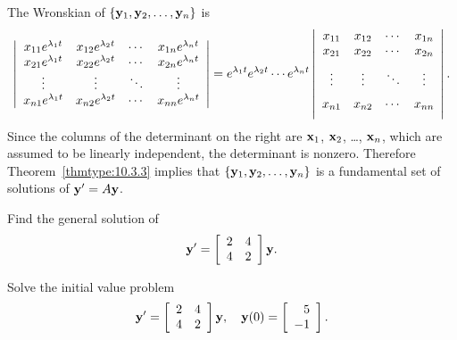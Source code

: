 The Wronskian of $\{{\bf y}_{1},{\bf y}_{2},\ldots,{\bf y}_{n}\}$ is
\[
  \left|
  \begin{array}{cccc}
    x_{11}e^{\lambda_{1}t} & x_{12}e^{\lambda_{2} t} & \cdots & x_{1n}e^{\lambda_{n}t}   \\
    x_{21}e^{\lambda_{1}t} & x_{22}e^{\lambda_{2} t} & \cdots & x_{2n}e^{\lambda_{n}t}   \\
    \vdots                 & \vdots                  & \ddots & \vdots                   \\
    x_{n1}e^{\lambda_{1}t} & x_{n2}e^{\lambda_{2} t} & \cdots & x_{nn}e^{\lambda _{n}t}
  \end{array}\right| =e^{\lambda_{1}t}e^{\lambda_{2}t}\cdots e^{\lambda_{n}t}\left|
  \begin{array}{cccc}
    x_{11}                & x_{12} & \cdots & x_{1n} \cr
    \vspace{2\jot} x_{21} & x_{22} & \cdots & x_{2n} \cr
    \vspace{2\jot} \vdots & \vdots & \ddots & \vdots \cr
    \vspace{2\jot} x_{n1} & x_{n2} & \cdots & x_{nn} \cr
  \end{array}\right|.
\]
Since the columns of the determinant on the right are ${\bf x}_{1}$, ${\bf x}_{2}$, \dots,
${\bf x}_{n}$, which are assumed to be linearly independent, the determinant is nonzero. Therefore
Theorem~\ref{thmtype:10.3.3} implies that $\{{\bf y}_{1},{\bf y}_{2},\ldots,{\bf y}_{n}\}$ is a
fundamental set of solutions of ${\bf y}'=A{\bf y}$.

\begin{example}
  \label{example:10.4.1}\rm \mbox{}
  \newline
  \begin{alist}
    \item %
    Find the general solution of
    \begin{equation}
      \label{eq:10.4.8}{\bf y}'=\left[\begin{array}{rr} 2&4\\4&2\end{array}\right]{\bf y}.
    \end{equation}

    \item %
    Solve the initial value problem
    \begin{equation}
      \label{eq:10.4.9}{\bf y}'=\left[\begin{array}{rr} 2&4\\4&2\end{array}\right]{\bf y},\quad{\bf y}(0)=\left[
      \begin{array}{r}
        5  \\
        -1
      \end{array}\right].
    \end{equation}
  \end{alist}
\end{example}

